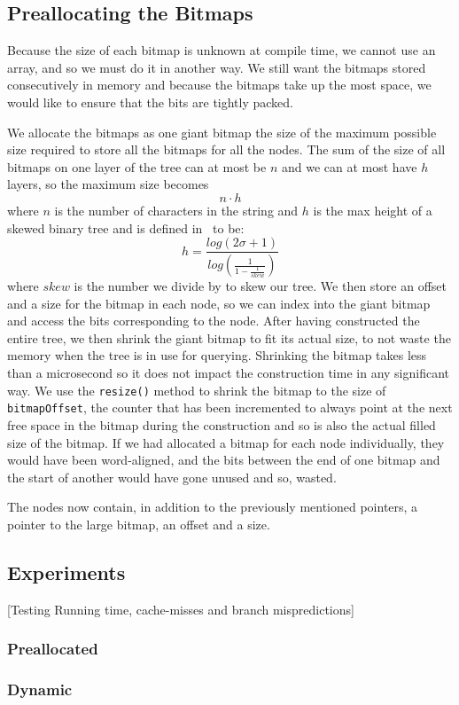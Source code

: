 \subsection{Preallocating the Bitmaps}
Because the size of each bitmap is unknown at compile time, we cannot use an array, and so we must do it in another way. We still want the bitmaps stored consecutively in memory and because the bitmaps take up the most space, we would like to ensure that the bits are tightly packed.

We allocate the bitmaps as one giant bitmap the size of the maximum possible size required to store all the bitmaps for all the nodes. The sum of the size of all bitmaps on one layer of the tree can at most be $n$ and we can at most have $h$ layers, so the maximum size becomes
\[n \cdot h\]
where $n$ is the number of characters in the string and $h$ is the max height of a skewed binary tree and is defined in~\cite{Nievergelt:1972:BST:800152.804906} to be:
\[ h = \frac{log(2\sigma+1)}{ log(\frac{1}{1-\frac{1}{skew}})}\]
where $skew$ is the number we divide by to skew our tree.  We then store an offset and a size for the bitmap in each node, so we can index into the giant bitmap and access the bits corresponding to the node.
After having constructed the entire tree, we then shrink the giant bitmap to fit its actual size, to not waste the memory when the tree is in use for querying. Shrinking the bitmap takes less than a microsecond so it does not impact the construction time in any significant way. We use the \texttt{resize()} method to shrink the bitmap to the size of \texttt{bitmapOffset}, the counter that has been incremented to always point at the next free space in the bitmap during the construction and so is also the actual filled size of the bitmap.
If we had allocated a bitmap for each node individually, they would have been word-aligned, and the bits between the end of one bitmap and the start of another would have gone unused and so, wasted.

The nodes now contain, in addition to the previously mentioned pointers, a pointer to the large bitmap, an offset and a size.



\subsection{Experiments}
[Testing Running time, cache-misses and branch mispredictions]
\subsubsection{Preallocated}

\subsubsection{Dynamic}




